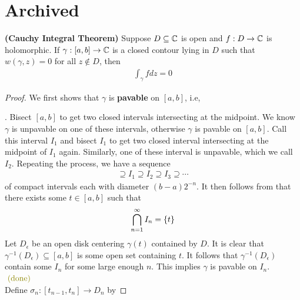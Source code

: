 \documentclass{report}
\begin{document}
\section{Archived}
\begin{theorem}
\textbf{(Cauchy Integral Theorem)} Suppose $D\subseteq \mathbb{C}$ is open and $f:D\rightarrow \mathbb{C}$ is holomorphic. If $\gamma :[a,b]\rightarrow \mathbb{C}$ is a closed contour lying in $D$ such that  $w(\gamma ,z)=0$ for all $z\not\in D$, then 
\begin{align*}
\int_\gamma  fdz=0 
\end{align*}
\end{theorem}
\begin{proof} 
We first shows that $\gamma $ is \textbf{pavable} on $[a,b]$, i.e, 
\begin{center}
   \begin{minipage}{0.9\linewidth}  
   \end{minipage}
\end{center}
. Bisect $[a,b]$  to get two closed intervals intersecting at the midpoint. We know $\gamma $ is unpavable on one of these intervals, otherwise $\gamma $ is pavable on $[a,b]$. Call this interval $I_1$ and bisect $I_1$ to get two closed interval intersecting at the midpoint of $I_1$ again. Similarly, one of these interval is unpavable, which we call $I_2$. Repeating the process, we have a sequence 
\begin{align*}
[a,b] \supseteq I_1 \supseteq I_2 \supseteq I_3 \supseteq \cdots 
\end{align*}
of compact intervals each with diameter $(b-a)2^{-n}$. It then follows from  that there exists some $t \in [a,b]$ such that 
\begin{align*}
\bigcap_{n=1}^{\infty} I_n =\{ t \}
\end{align*}
Let $D_\epsilon$ be an open disk centering $\gamma (t)$ contained by $D$. It is clear that $\gamma ^{-1}(D_\epsilon )\subseteq [a,b]$ is some open set containing $t$. It follows that  $\gamma ^{-1}(D_\epsilon )$ contain some $I_n$ for some large enough  $n$. This implies $\gamma $ is pavable on $I_n$.  \CaC $\odone$\\

Define $\sigma_n:[t_{n-1},t_n]\rightarrow D_n$ by 

\end{proof}
\end{document}
